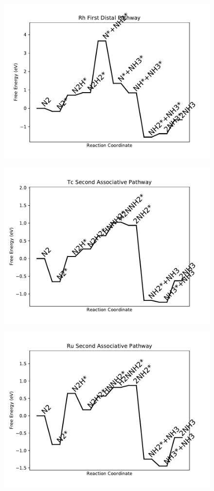 \begin{figure}
\includegraphics[width=0.8\linewidth]{data/plots/Rh_distal_1.pdf}
\label{fig:Rh_distal_1}
\end{figure}

\begin{figure}
\includegraphics[width=0.8\linewidth]{data/plots/Tc_associative_2.pdf}
\label{fig:Tc_associative_2}
\end{figure}

\begin{figure}
\includegraphics[width=0.8\linewidth]{data/plots/Ru_associative_2.pdf}
\label{fig:Ru_associative_2}
\end{figure}


